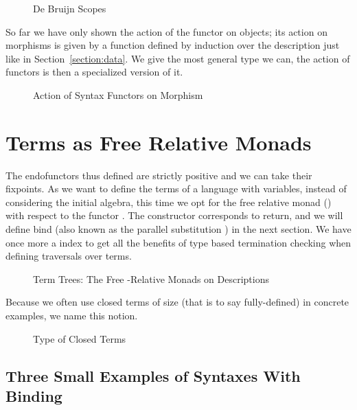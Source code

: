 \begin{figure}[h]
\caption{De Bruijn Scopes}\label{figure:debruijnscope}
\end{figure}

So far we have only shown the action of the functor on objects; its action
on morphisms is given by a function  defined by induction over the
description just like in Section~\ref{section:data}. We give  the
most general type we can, the action of functors is then a specialized
version of it.

\begin{figure}[h]
\caption{Action of Syntax Functors on Morphism\label{figure:descfmap}}
\end{figure}

\section{Terms as Free Relative Monads}

The endofunctors thus defined are strictly positive and we can take
their fixpoints.
As we want to define the terms of a language with variables, instead of
considering the initial algebra, this time we opt for the free relative
monad (\cite{Altenkirch2010, JFR4389}) with respect to the functor .
The  constructor corresponds to return, and we will define bind (also
known as the parallel substitution ) in the next section.
We have once more a  index to get all the benefits of type based
termination checking when defining traversals over terms.

\begin{figure}[h]
\caption{Term Trees: The Free -Relative Monads on Descriptions\label{figure:freemonad}}
\end{figure}

Because we often use closed terms of size  (that is to say fully-defined)
in concrete examples, we name this notion.

\begin{figure}[h]
\caption{Type of Closed Terms\label{fig:closedtm}}
\end{figure}

\subsection{Three Small Examples of Syntaxes With Binding}


